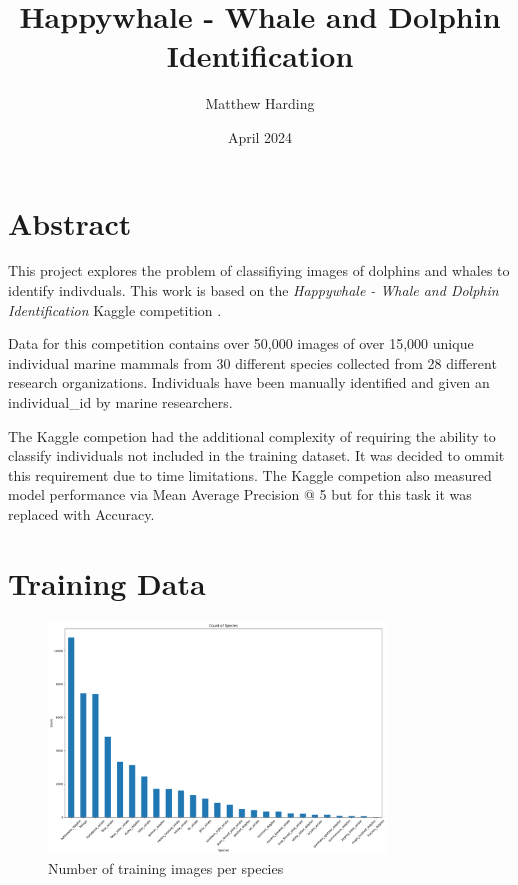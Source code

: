\documentclass{article}
\title{Happywhale - Whale and Dolphin Identification}
\author{Matthew Harding}
\date{April 2024}
\begin{document}
\maketitle

\section{Abstract}
This project explores the problem of classifiying images of dolphins and whales to identify indivduals. This work 
is based on the \emph{Happywhale - Whale and Dolphin Identification} Kaggle competition \cite{kaggle_comp}.

Data for this competition contains over 50,000 images of over 15,000 unique individual marine mammals from 30 different species collected from 28 different research organizations. 
Individuals have been manually identified and given an individual\_id by marine researchers.

The Kaggle competion had the additional complexity of requiring the ability to classify individuals not included in the training dataset. It was decided to ommit this requirement due to time limitations. The Kaggle competion also measured model performance via Mean Average Precision @ 5 but for this task it was replaced with Accuracy.

\section{Training Data}

\begin{figure}[!htb]
    \centering
    \includegraphics[width=0.8\textwidth]{species_histogram.png}
    \caption{Number of training images per species}
    \label{fig:species_count_histogram}
\end{figure}
\end{document}
